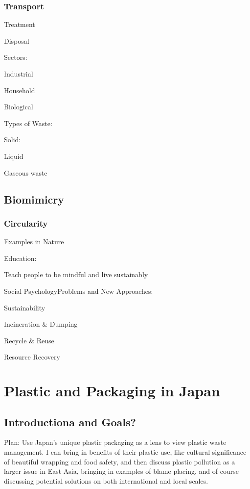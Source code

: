 \documentclass{book}\usepackage{knitr}
\begin{document}
\subsection{Transport}

Treatment

Disposal

Sectors:

Industrial

Household

Biological 

Types of Waste:

Solid:

Liquid

Gaseous waste

\section{Biomimicry}

\subsection{Circularity}

Examples in Nature

Education:

Teach people to be mindful and live sustainably

Social PsychologyProblems and New Approaches: 

Sustainability

Incineration \& Dumping

Recycle \& Reuse

Resource Recovery


\chapter{Plastic and Packaging in Japan}

\section{Introductiona and Goals?}

Plan: Use Japan's unique plastic packaging as a lens to view plastic waste management. I can bring in benefits of their plastic use, like cultural significance of beautiful wrapping and food safety, and then discuss plastic pollution as a larger issue in East Asia, bringing in examples of blame placing, and of course discussing potential solutions on both international and local scales. 
\end{document}
